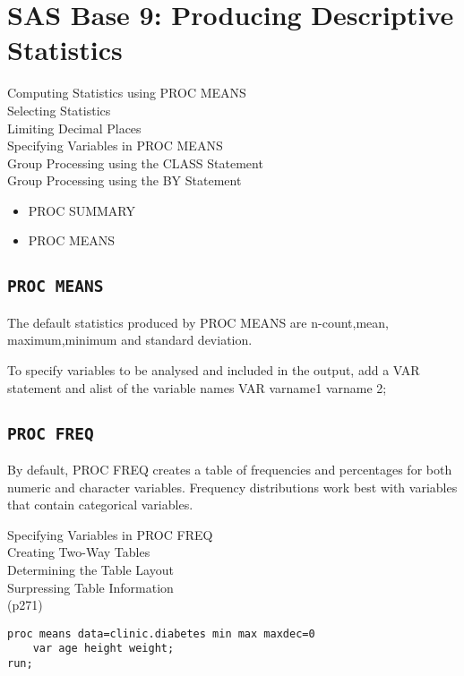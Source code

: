 \section{SAS Base 9: Producing Descriptive Statistics}


Computing Statistics using PROC MEANS\\
Selecting Statistics\\
Limiting Decimal Places\\
Specifying Variables in PROC MEANS\\
Group Processing using the CLASS Statement\\
Group Processing using the BY Statement\\

\begin{itemize}
\item PROC SUMMARY
\item PROC MEANS
\end{itemize}

\subsection{\texttt{PROC MEANS}}
The default statistics produced by PROC MEANS are n-count,mean, maximum,minimum and standard deviation.

To specify variables to be analysed and included in the output, add a VAR statement and alist of the variable names
VAR varname1 varname 2;

\subsection{\texttt{PROC FREQ}}
By default, PROC FREQ creates a table of frequencies and percentages for both numeric and character variables.
Frequency distributions work best with variables that contain categorical variables.

Specifying Variables in PROC FREQ\\
Creating Two-Way Tables\\
Determining the Table Layout\\
Surpressing Table Information\\


(p271)
\begin{framed}
\begin{verbatim}
proc means data=clinic.diabetes min max maxdec=0
    var age height weight;
run;
\end{verbatim}
\end{framed}





